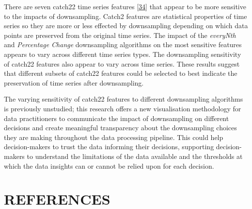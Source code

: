 \documentclass{article}
\begin{document}
There are seven catch22 time series features
\protect\hyperlink{ref-catch22}{{[}34{]}} that appear to be more
sensitive to the impacts of downsampling. Catch2 features are
statistical properties of time series so they are more or less effected
by downsampling depending on which data points are preserved from the
original time series. The impact of the \emph{everyNth} and
\emph{Percentage Change} downsampling algorithms on the most sensitive
features appears to vary across different time series types. The
downsampling sensitivity of catch22 features also appear to vary across
time series. These results suggest that different subsets of catch22
features could be selected to best indicate the preservation of time
series after downsampling.

The varying sensitivity of catch22 features to different downsampling
algorithms is previously unstudied; this research offers a new
visualisation methodology for data practitioners to communicate the
impact of downsampling on different decisions and create meaningful
transparency about the downsampling choices they are making throughout
the data processing pipeline. This could help decision-makers to trust
the data informing their decisions, supporting decision-makers to
understand the limitations of the data available and the thresholds at
which the data insights can or cannot be relied upon for each decision.

\hypertarget{references}{%
\section*{REFERENCES}\label{references}}
\end{document}
